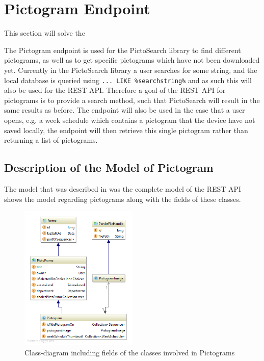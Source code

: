\section{Pictogram Endpoint}\label{pictogramendpoint}
This section will solve the 

The Pictogram endpoint is used for the PictoSearch library to find different pictograms, as well as to get specific pictograms which have not been downloaded yet.
Currently in the PictoSearch library a user searches for some string, and the local database is queried using \texttt{... LIKE \%searchstring\%} and as such this will also be used for the REST API.
Therefore a goal of the REST API for pictograms is to provide a search method, such that PictoSearch will result in the same results as before.
The endpoint will also be used in the case that a user opens, e.g. a week schedule which contains a pictogram that the device have not saved locally, the endpoint will then retrieve this single pictogram rather than returning a list of pictograms.

\subsection{Description of the Model of Pictogram}\label{subsec:pictomodel}
The model that was described in  was the complete model of the REST API  shows the model regarding pictograms along with the fields of these classes.

\begin{figure}[h]
    \centering
    \includegraphics[width=0.5\textwidth]{figures/diagram-pictogram.png}
    \caption{Class-diagram including fields of the classes involved in Pictograms}\label{fig:pictogramModel}
\end{figure}

